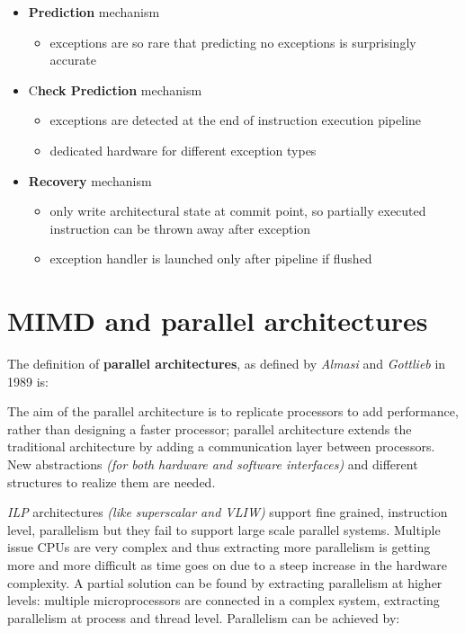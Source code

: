 \documentclass[english]{article}
\begin{document}
\begin{itemize}
  \item \textbf{Prediction} mechanism
        \begin{itemize}[label=\(\rightarrow\)]
          \item exceptions are so rare that predicting no exceptions is surprisingly accurate
        \end{itemize}
  \item C\textbf{heck Prediction} mechanism
        \begin{itemize}[label=\(\rightarrow\)]
          \item exceptions are detected at the end of instruction execution pipeline
          \item dedicated hardware for different exception types
        \end{itemize}
  \item \textbf{Recovery} mechanism
        \begin{itemize}[label=\(\rightarrow\)]
          \item only write architectural state at commit point, so partially executed instruction can be thrown away after exception
          \item exception handler is launched only after pipeline if flushed
        \end{itemize}
\end{itemize}

\clearpage

\section{MIMD and parallel architectures}
\label{sec:mimd}

The definition of \textbf{parallel architectures}, as defined by \textit{Almasi} and \textit{Gottlieb} in 1989 is:


The aim of the parallel architecture is to replicate processors to add performance, rather than designing a faster processor;
parallel architecture extends the traditional architecture by adding a communication layer between processors.
New abstractions \textit{(for both hardware and software interfaces)} and different structures to realize them are needed.

\bigskip
\textit{ILP} architectures \textit{(like superscalar and VLIW)} support fine grained, instruction level, parallelism but they fail to support large scale parallel systems.
Multiple issue CPUs are very complex and thus extracting more parallelism is getting more and more difficult as time goes on due to a steep increase in the hardware complexity.
A partial solution can be found by extracting parallelism at higher levels: multiple microprocessors are connected in a complex system, extracting parallelism at process and thread level.
Parallelism can be achieved by:
\end{document}
